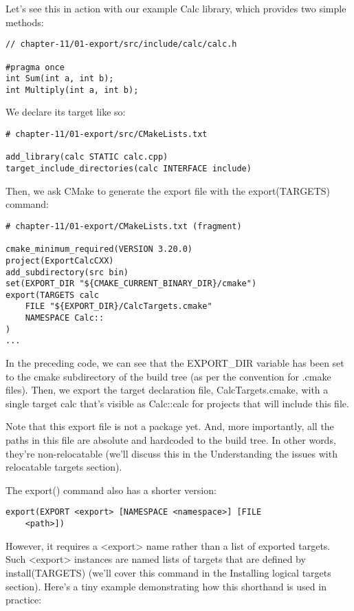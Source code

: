 Let's see this in action with our example Calc library, which provides two simple methods:

\begin{lstlisting}[style=styleCXX]
// chapter-11/01-export/src/include/calc/calc.h

#pragma once
int Sum(int a, int b);
int Multiply(int a, int b);
\end{lstlisting}

We declare its target like so:

\begin{lstlisting}[style=styleCMake]
# chapter-11/01-export/src/CMakeLists.txt

add_library(calc STATIC calc.cpp)
target_include_directories(calc INTERFACE include)
\end{lstlisting}

Then, we ask CMake to generate the export file with the export(TARGETS) command:

\begin{lstlisting}[style=styleCMake]
# chapter-11/01-export/CMakeLists.txt (fragment)

cmake_minimum_required(VERSION 3.20.0)
project(ExportCalcCXX)
add_subdirectory(src bin)
set(EXPORT_DIR "${CMAKE_CURRENT_BINARY_DIR}/cmake")
export(TARGETS calc
	FILE "${EXPORT_DIR}/CalcTargets.cmake"
	NAMESPACE Calc::
)
...
\end{lstlisting}

In the preceding code, we can see that the EXPORT\_DIR variable has been set to the cmake subdirectory of the build tree (as per the convention for .cmake files). Then, we export the target declaration file, CalcTargets.cmake, with a single target calc that's visible as Calc::calc for projects that will include this file.

Note that this export file is not a package yet. And, more importantly, all the paths in this file are absolute and hardcoded to the build tree. In other words, they're non-relocatable (we'll discuss this in the Understanding the issues with relocatable targets section).

The export() command also has a shorter version:

\begin{lstlisting}[style=styleCMake]
export(EXPORT <export> [NAMESPACE <namespace>] [FILE
	<path>])
\end{lstlisting}

However, it requires a <export> name rather than a list of exported targets. Such <export> instances are named lists of targets that are defined by install(TARGETS) (we'll cover this command in the Installing logical targets section). Here's a tiny example demonstrating how this shorthand is used in practice:

